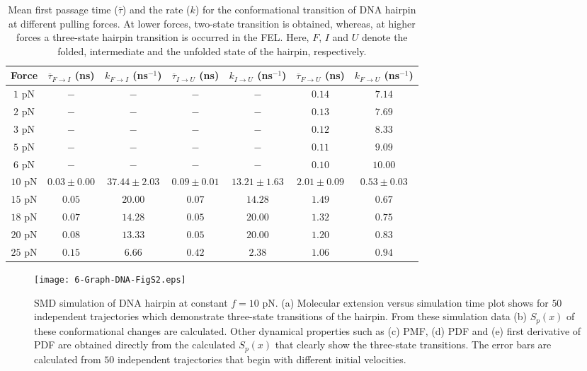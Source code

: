 \documentclass[twoside,twocolumn,9pt]{article}
\begin{document}
\begin{table*}[t!]
\centering
\begin{tabular}{ccccccc}
\hline\hline
{\bf{Force}} & {${\overline{\tau}_{{F}\to{I}}}$} {{(ns)}} &  ${k_{{F}\to{I}}}$ (ns$^{-1}$) &  {${\overline{\tau}_{{I}\to{U}}}$} {{(ns)}}  
 &  ${k_{{I}\to{U}}}$ (ns$^{-1}$)  &  {${\overline{\tau}_{{F}\to{U}}}$} {{(ns)}}  & ${k_{{F}\to{U}}}$ (ns$^{-1}$)  \\
 \hline
$1$ pN  & $-$ & $-$ & $-$ & $-$ & $0.14$ & $7.14$ \\
$2$ pN  & $-$ & $-$ & $-$ & $-$ & $0.13$ & $7.69$ \\
$3$ pN  & $-$ & $-$ & $-$ & $-$ & $0.12$ & $8.33$ \\
$5$ pN  & $-$ & $-$ & $-$ & $-$ & $0.11$ & $9.09$ \\
$6$ pN  & $-$ & $-$ & $-$ & $-$ & $0.10$ & $10.00$ \\
$10$ pN  & $0.03\pm{0.00}$ & $37.44\pm{2.03}$  & $0.09\pm{0.01}$ & 
$13.21\pm{1.63}$ & $2.01\pm{0.09}$ & $0.53\pm{0.03}$ \\
$15$ pN  & $0.05$ & $20.00$ & $0.07$ & $14.28$ & $1.49$ & $0.67$ \\
$18$ pN  & $0.07$ & $14.28$ & $0.05$ & $20.00$ & $1.32$ & $0.75$ \\
$20$ pN  & $0.08$ & $13.33$ & $0.05$ & $20.00$ & $1.20$ & $0.83$ \\
$25$ pN  & $0.15$ & $6.66$ & $0.42$ & $2.38$ & $1.06$ & $0.94$ \\
\hline\hline
\end{tabular}
\caption{Mean first passage time ($\overline{\tau}$) and the rate ($k$) for the conformational transition of DNA hairpin 
at different pulling forces. At lower forces, two-state transition is obtained, whereas, at higher forces a 
three-state hairpin transition is occurred in the FEL. Here, $F$, $I$ and $U$ denote the 
folded, intermediate and the unfolded state of the hairpin, respectively.}
\label{MFPT-Rate-Table}
\end{table*} 

\begin{figure}[b!]
\texttt{[image: 6-Graph-DNA-FigS2.eps]}
\caption{SMD simulation of DNA hairpin at constant $f=10$ pN. (a) Molecular extension versus
simulation time plot shows for $50$ independent trajectories which demonstrate three-state transitions 
of the hairpin.
From these simulation data (b) $S_{p}(x)$ of these conformational changes are calculated. Other dynamical
properties such as (c) PMF, (d) PDF and (e) first derivative of PDF are obtained directly from the calculated $S_{p}(x)$ that 
clearly show the three-state transitions. The error bars are calculated from $50$ independent trajectories that begin
with different initial velocities.} 
\label{Splitting-DNA-10pN}
\end{figure}
\end{document}
